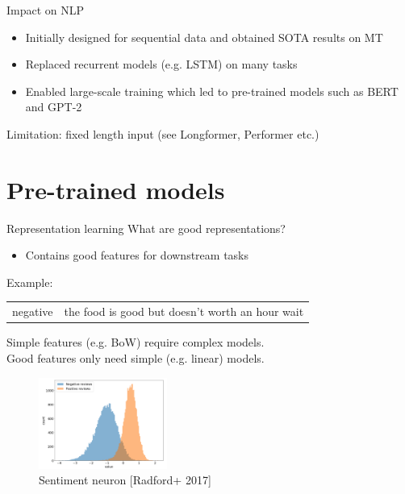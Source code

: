 \documentclass[usenames,dvipsnames,11pt,aspectratio=169]{beamer}
\begin{document}
\begin{frame}
    {Impact on NLP}
    \begin{itemize}
        \item Initially designed for sequential data and obtained SOTA results on MT
        \item Replaced recurrent models (e.g. LSTM) on many tasks
        \item Enabled large-scale training which led to pre-trained models such as BERT and GPT-2
    \end{itemize}

    Limitation: fixed length input (see Longformer, Performer etc.)
\end{frame}

\section{Pre-trained models}

\begin{frame}
    {Representation learning}
    What are good representations?\\
    \begin{itemize}
        \item[] Contains good features for downstream tasks 
    \end{itemize}
    Example:
    \vspace{-1em}
    \begin{table}
        \begin{tabular}{ll}
            negative & the food is good but doesn't worth an hour wait
        \end{tabular}
    \end{table}
    Simple features (e.g. BoW) require complex models.\\
    Good features only need simple (e.g. linear) models.
    \begin{figure}
        \includegraphics[height=3cm]{figures/sentiment}
        \caption{Sentiment neuron [Radford+ 2017]}
    \end{figure}
\end{frame}
\end{document}
